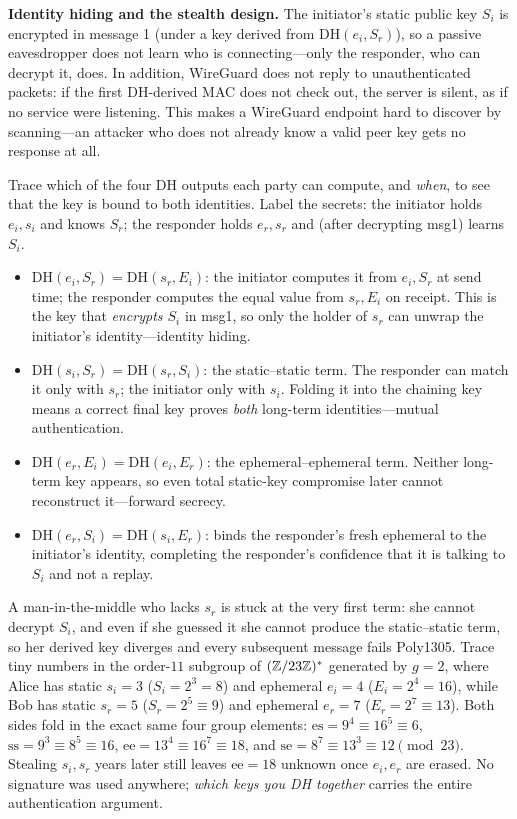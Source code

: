 \begin{whybox}
\textbf{Identity hiding and the stealth design.} The initiator's static public key \(S_i\) is encrypted in message 1 (under a key derived from \(\mathrm{DH}(e_i, S_r)\)), so a passive eavesdropper does not learn who is connecting---only the responder, who can decrypt it, does. In addition, WireGuard does not reply to unauthenticated packets: if the first DH-derived MAC does not check out, the server is silent, as if no service were listening. This makes a WireGuard endpoint hard to discover by scanning---an attacker who does not already know a valid peer key gets no response at all.
\end{whybox}

\begin{walkbox}
Trace which of the four DH outputs each party can compute, and \emph{when}, to see that the key is bound to both identities. Label the secrets: the initiator holds \(e_i, s_i\) and knows \(S_r\); the responder holds \(e_r, s_r\) and (after decrypting msg1) learns \(S_i\).
\begin{itemize}
\item \(\mathrm{DH}(e_i, S_r) = \mathrm{DH}(s_r, E_i)\): the initiator computes it from \(e_i, S_r\) at send time; the responder computes the equal value from \(s_r, E_i\) on receipt. This is the key that \emph{encrypts \(S_i\)} in msg1, so only the holder of \(s_r\) can unwrap the initiator's identity---identity hiding.
\item \(\mathrm{DH}(s_i, S_r) = \mathrm{DH}(s_r, S_i)\): the static--static term. The responder can match it only with \(s_r\); the initiator only with \(s_i\). Folding it into the chaining key means a correct final key proves \emph{both} long-term identities---mutual authentication.
\item \(\mathrm{DH}(e_r, E_i) = \mathrm{DH}(e_i, E_r)\): the ephemeral--ephemeral term. Neither long-term key appears, so even total static-key compromise later cannot reconstruct it---forward secrecy.
\item \(\mathrm{DH}(e_r, S_i) = \mathrm{DH}(s_i, E_r)\): binds the responder's fresh ephemeral to the initiator's identity, completing the responder's confidence that it is talking to \(S_i\) and not a replay.
\end{itemize}
A man-in-the-middle who lacks \(s_r\) is stuck at the very first term: she cannot decrypt \(S_i\), and even if she guessed it she cannot produce the static--static term, so her derived key diverges and every subsequent message fails Poly1305. Trace tiny numbers in the order-\(11\) subgroup of \((\mathbb{Z}/23\mathbb{Z})^{*}\) generated by \(g=2\), where Alice has static \(s_i=3\) (\(S_i = 2^3 = 8\)) and ephemeral \(e_i=4\) (\(E_i = 2^4 = 16\)), while Bob has static \(s_r=5\) (\(S_r = 2^5 \equiv 9\)) and ephemeral \(e_r=7\) (\(E_r = 2^7 \equiv 13\)). Both sides fold in the exact same four group elements: \(\mathrm{es} = 9^4 \equiv 16^5 \equiv 6\), \(\mathrm{ss} = 9^3 \equiv 8^5 \equiv 16\), \(\mathrm{ee} = 13^4 \equiv 16^7 \equiv 18\), and \(\mathrm{se} = 8^7 \equiv 13^3 \equiv 12 \pmod{23}\). Stealing \(s_i, s_r\) years later still leaves \(\mathrm{ee}=18\) unknown once \(e_i, e_r\) are erased. No signature was used anywhere; \emph{which keys you DH together} carries the entire authentication argument.

\end{walkbox}

